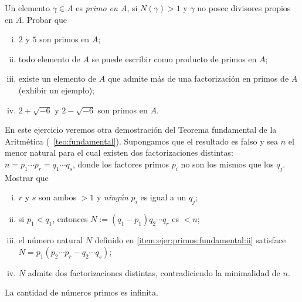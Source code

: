 \begin{ejerPrimos}
	Un elemento $\gamma\in A$ es \emph{primo en $A$}, si $N(\gamma)>1$ y
	$\gamma$ no posee divisores propios en $A$. Probar que
	\begin{enumerate}[(i)]
		\item\label{item:ejer:primos:cuadratico:casos}
			$2$ y $5$ son primos en $A$;
		\item\label{item:ejer:primos:cuadratico:factorizacion:existe}
			todo elemento de $A$ se puede escribir como producto
			de primos en $A$;
		\item\label{item:ejer:primos:cuadratico:factorizacion:no-es-unica}
			existe un elemento de $A$ que admite m\'as de una
			factorizaci\'on en primos de $A$ (exhibir un ejemplo);
		\item\label{item:ejer:primos:cuadratico:otros-casos}
			$2+\sqrt{-6}$ y $2-\sqrt{-6}$ son primos en $A$.
	\end{enumerate}
\end{ejerPrimos}

\begin{ejerPrimos}\label{ejer:primos:fundamental:otra-demo}
	En este ejercicio veremos otra demostraci\'on del Teorema fundamental
	de la Aritm\'etica (\teoname~\ref{teo:fundamental}). Supongamos que el
	resultado es falso y sea $n$ el menor natural para el cual existen dos
	factorizaciones distintas: $n=p_1\cdots p_r=q_1\cdots q_s$, donde los
	factores primos $p_i$ no son los mismos que los $q_j$. Mostrar que
	\begin{enumerate}[(i)]
		\item\label{item:ejer:primos:fundamental:i}
			$r$ y $s$ son ambos $>1$ y \emph{ning\'un} $p_i$ es
			igual a un $q_j$;%
		\item\label{item:ejer:primos:fundamental:ii}
			si $p_1<q_1$, entonces $N:=(q_1-p_1)q_2\cdots q_r$
			es $<n$;
		\item\label{item:ejer:primos:fundamental:iii}
			el n\'umero natural $N$ definido en
			\eqref{item:ejer:primos:fundamental:ii} satisface
			$N=p_1(p_2\cdots p_r-q_2\cdots q_s)$;
		\item\label{item:ejer:primos:fundamental:iv}
			$N$ admite dos factorizaciones distintas,
			contradiciendo la minimalidad de $n$.
	\end{enumerate}
\end{ejerPrimos}

\begin{ejerPrimos}\label{ejer:primos:euclides}
	La cantidad de n\'umeros primos es infinita.%
\end{ejerPrimos}

